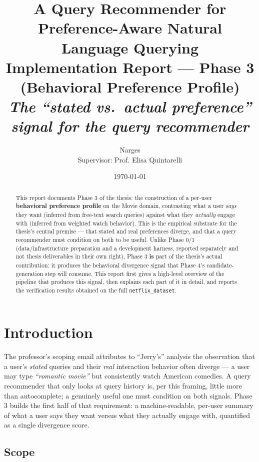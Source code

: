 \documentclass[11pt,a4paper]{article}
\title{\Large \textbf{A Query Recommender for Preference-Aware Natural Language Querying} \\[4pt]
\large Implementation Report --- Phase 3 (Behavioral Preference Profile) \\[2pt]
\normalsize \emph{The ``stated vs.\ actual preference'' signal for the query recommender}}
\author{Narges \\ \small Supervisor: Prof. Elisa Quintarelli}
\date{\today}
\newcommand{\code}[1]{\texttt{#1}}
\begin{document}
\maketitle

\begin{abstract}
\noindent
This report documents Phase 3 of the thesis: the construction of a per-user \textbf{behavioral
preference profile} on the Movie domain, contrasting what a user \emph{says} they want (inferred
from free-text search queries) against what they \emph{actually} engage with (inferred from
weighted watch behavior). This is the empirical substrate for the thesis's central premise ---
that stated and real preferences diverge, and that a query recommender must condition on both to
be useful. Unlike Phase 0/1 (data/infrastructure preparation and a development harness, reported
separately and not thesis deliverables in their own right), Phase 3 \textbf{is} part of the
thesis's actual contribution: it produces the behavioral divergence signal that Phase 4's
candidate-generation step will consume. This report first gives a high-level overview of the
pipeline that produces this signal, then explains each part of it in detail, and reports the
verification results obtained on the full \code{netflix\_dataset}.
\end{abstract}

\tableofcontents
\newpage

\section{Introduction}

The professor's scoping email attributes to ``Jerry's'' analysis the observation that a user's
\emph{stated} queries and their \emph{real} interaction behavior often diverge --- a user may
type \emph{``romantic movie''} but consistently watch American comedies. A query recommender that
only looks at query history is, per this framing, little more than autocomplete; a genuinely
useful one must condition on both signals. Phase 3 builds the first half of that requirement: a
machine-readable, per-user summary of what a user says they want versus what they actually engage
with, quantified as a single divergence score.

\subsection{Scope}
\end{document}
